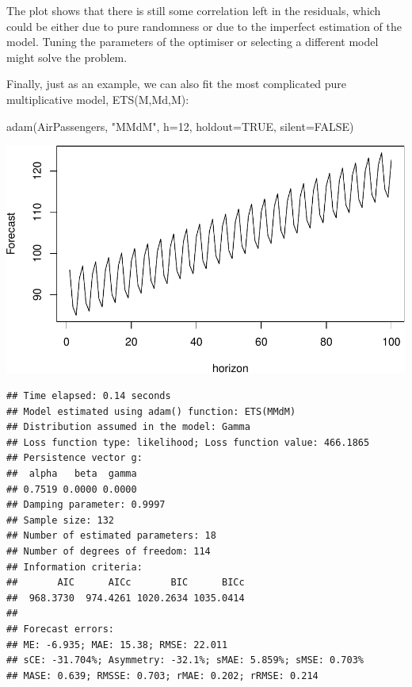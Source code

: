 \documentclass[
]{book}
\newenvironment{Shaded}{\begin{snugshade}}{\end{snugshade}}
\newcommand{\AttributeTok}[1]{\textcolor[rgb]{0.77,0.63,0.00}{#1}}
\newcommand{\ConstantTok}[1]{\textcolor[rgb]{0.00,0.00,0.00}{#1}}
\newcommand{\DecValTok}[1]{\textcolor[rgb]{0.00,0.00,0.81}{#1}}
\newcommand{\FunctionTok}[1]{\textcolor[rgb]{0.00,0.00,0.00}{#1}}
\newcommand{\NormalTok}[1]{#1}
\newcommand{\StringTok}[1]{\textcolor[rgb]{0.31,0.60,0.02}{#1}}
\theoremstyle{definition}
\theoremstyle{definition}
\theoremstyle{definition}
\theoremstyle{definition}
\theoremstyle{remark}
\begin{document}
The plot shows that there is still some correlation left in the residuals, which could be either due to pure randomness or due to the imperfect estimation of the model. Tuning the parameters of the optimiser or selecting a different model might solve the problem.

Finally, just as an example, we can also fit the most complicated pure multiplicative model, ETS(M,Md,M):

\begin{Shaded}
\begin{Highlighting}[]
\FunctionTok{adam}\NormalTok{(AirPassengers, }\StringTok{"MMdM"}\NormalTok{, }\AttributeTok{h=}\DecValTok{12}\NormalTok{, }\AttributeTok{holdout=}\ConstantTok{TRUE}\NormalTok{, }\AttributeTok{silent=}\ConstantTok{FALSE}\NormalTok{)}
\end{Highlighting}
\end{Shaded}

\includegraphics{adam_files/figure-latex/unnamed-chunk-44-1.pdf}

\begin{verbatim}
## Time elapsed: 0.14 seconds
## Model estimated using adam() function: ETS(MMdM)
## Distribution assumed in the model: Gamma
## Loss function type: likelihood; Loss function value: 466.1865
## Persistence vector g:
##  alpha   beta  gamma 
## 0.7519 0.0000 0.0000 
## Damping parameter: 0.9997
## Sample size: 132
## Number of estimated parameters: 18
## Number of degrees of freedom: 114
## Information criteria:
##       AIC      AICc       BIC      BICc 
##  968.3730  974.4261 1020.2634 1035.0414 
## 
## Forecast errors:
## ME: -6.935; MAE: 15.38; RMSE: 22.011
## sCE: -31.704%; Asymmetry: -32.1%; sMAE: 5.859%; sMSE: 0.703%
## MASE: 0.639; RMSSE: 0.703; rMAE: 0.202; rRMSE: 0.214
\end{verbatim}
\end{document}
